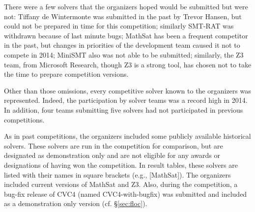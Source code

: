 \documentclass[twoside,11pt]{article}
\begin{document}
There were a few solvers that the organizers hoped would be submitted but were not: Tiffany de Wintermonte was submitted in the past by Trevor Hansen, but could not be prepared in time for this competition; similarly SMT-RAT was withdrawn because of last minute bugs; MathSat has been a frequent competitor in the past, but changes in priorities of the development team caused it not to compete in 2014; MiniSMT also was not able to be submitted; similarly, the Z3 team, from Microsoft Research, though Z3 is a strong tool, has chosen not to take the time to prepare competition versions.

Other than those omissions, every competitive solver known to the organizers was represented. Indeed, the participation by solver teams was a record high in 2014. In addition, four teams submitting five solvers had not participated in previous competitions. 

As in past competitions, the organizers included some publicly available historical solvers. These solvers are run in the competition for comparison, but are designated as demonstration only and are not eligible for any awards or designations of having won the competition. In result tables, these solvers are listed with their names in square brackets (e.g., [MathSat]). The organizers included current versions of MathSat and Z3. Also, during the competition, a bug-fix release of CVC4 (named CVC4-with-bugfix) was submitted and included as a demonstration only version (cf. \S\ref{sec:floc}).
\end{document}

